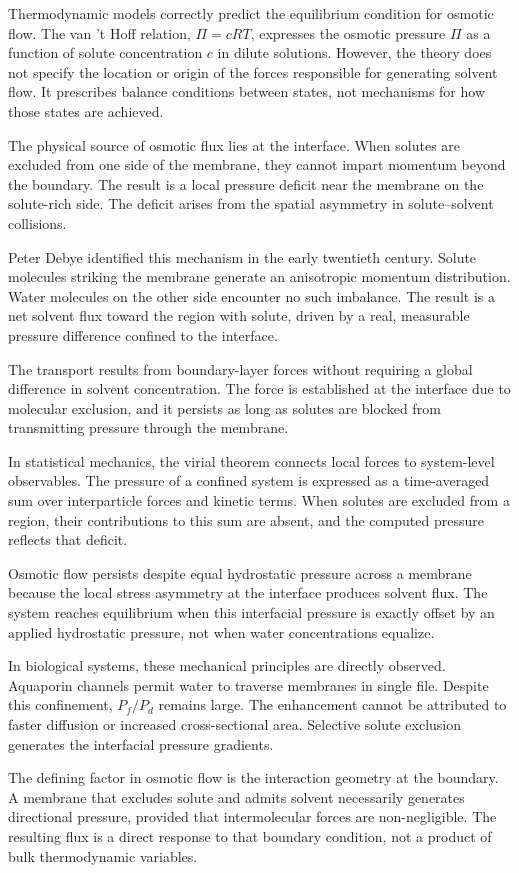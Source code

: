 Thermodynamic models correctly predict the equilibrium condition for osmotic flow. The van ’t Hoff relation, $\Pi = cRT$, expresses the osmotic pressure $\Pi$ as a function of solute concentration $c$ in dilute solutions. However, the theory does not specify the location or origin of the forces responsible for generating solvent flow. It prescribes balance conditions between states, not mechanisms for how those states are achieved.

The physical source of osmotic flux lies at the interface. When solutes are excluded from one side of the membrane, they cannot impart momentum beyond the boundary. The result is a local pressure deficit near the membrane on the solute-rich side. The deficit arises from the spatial asymmetry in solute–solvent collisions.

Peter Debye identified this mechanism in the early twentieth century. Solute molecules striking the membrane generate an anisotropic momentum distribution. Water molecules on the other side encounter no such imbalance. The result is a net solvent flux toward the region with solute, driven by a real, measurable pressure difference confined to the interface.

The transport results from boundary-layer forces without requiring a global difference in solvent concentration. The force is established at the interface due to molecular exclusion, and it persists as long as solutes are blocked from transmitting pressure through the membrane.

In statistical mechanics, the virial theorem connects local forces to system-level observables. The pressure of a confined system is expressed as a time-averaged sum over interparticle forces and kinetic terms. When solutes are excluded from a region, their contributions to this sum are absent, and the computed pressure reflects that deficit.

Osmotic flow persists despite equal hydrostatic pressure across a membrane because the local stress asymmetry at the interface produces solvent flux. The system reaches equilibrium when this interfacial pressure is exactly offset by an applied hydrostatic pressure, not when water concentrations equalize.

In biological systems, these mechanical principles are directly observed. Aquaporin channels permit water to traverse membranes in single file. Despite this confinement, $P_f / P_d$ remains large. The enhancement cannot be attributed to faster diffusion or increased cross-sectional area. Selective solute exclusion generates the interfacial pressure gradients.

The defining factor in osmotic flow is the interaction geometry at the boundary. A membrane that excludes solute and admits solvent necessarily generates directional pressure, provided that intermolecular forces are non-negligible. The resulting flux is a direct response to that boundary condition, not a product of bulk thermodynamic variables.



